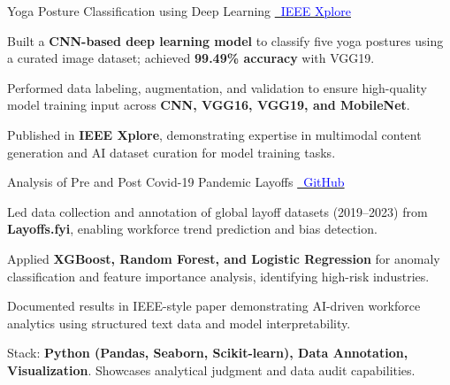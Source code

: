 


\cventry
    {Yoga Posture Classification using Deep Learning 
    \href{https://ieeexplore.ieee.org/document/10094490}
       {\textcolor{blue}{\faLink\ IEEE Xplore}}}
    {}
    {
      \begin{cvitems}
        \item {Built a {\bf CNN-based deep learning model} to classify five yoga postures using a curated image dataset; achieved {\bf 99.49\% accuracy} with VGG19.}
        \item {Performed data labeling, augmentation, and validation to ensure high-quality model training input across {\bf CNN, VGG16, VGG19, and MobileNet}.}
        \item {Published in {\bf IEEE Xplore}, demonstrating expertise in multimodal content generation and AI dataset curation for model training tasks.}
      \end{cvitems}
    }

\cventry
    {Analysis of Pre and Post Covid-19 Pandemic Layoffs 
    \href{https://github.com/Goku007007/Analysis-of-Pre-and-Post-Covid-19-Pandemic-Layoffs}
       {\textcolor{blue}{\faGithub\ GitHub}}}
    {}
    {
      \begin{cvitems}
        \item {Led data collection and annotation of global layoff datasets (2019–2023) from {\bf Layoffs.fyi}, enabling workforce trend prediction and bias detection.}
        \item {Applied {\bf XGBoost, Random Forest, and Logistic Regression} for anomaly classification and feature importance analysis, identifying high-risk industries.}
        \item {Documented results in IEEE-style paper demonstrating AI-driven workforce analytics using structured text data and model interpretability.}
        \item {Stack: {\bf Python (Pandas, Seaborn, Scikit-learn), Data Annotation, Visualization}. Showcases analytical judgment and data audit capabilities.}
      \end{cvitems}
    }

